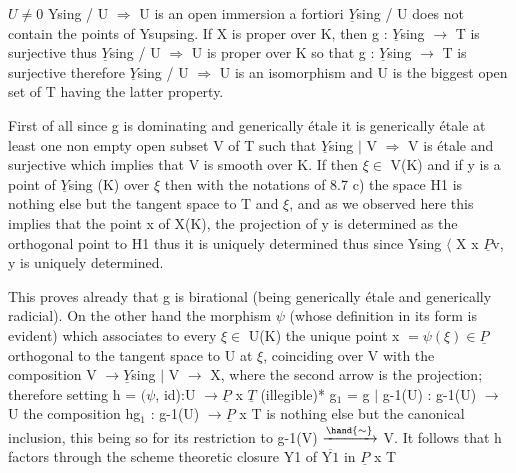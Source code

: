 
$U \neq 0$ Ysing / U $\Rightarrow$ U is an open immersion a fortiori $\underline{Y}$sing / U does 
not contain the points of Ysupsing.  If X is proper over K, then
g : $\underline{Y}$sing $\to$ T is surjective thus $\underline{Y}$sing / U $\Rightarrow$ U is proper over K so
that g : $\underline{Y}$sing $\to$ T is surjective therefore $\underline{Y}$sing / U $\Rightarrow$ U is an
isomorphism and U is the biggest open set of T having the latter 
property.

First of all since g is dominating and generically étale it
is generically étale at least one non empty open subset V of T
such that $\underline{Y}$sing $|$ V $\Rightarrow$ V is étale and surjective which implies that
V is smooth over K.  If then $\xi \in$ V(K) and if y is a point of $\underline{Y}$sing
(K) over $\xi$ then with the notations of 8.7 c) the space H1 is
nothing else but the tangent space to T and $\xi$, and as we observed
here this implies that the point x of X(K), the projection of y is
determined as the orthogonal point to H1 thus it is uniquely
determined thus since Ysing $\langle$ X x $\underline{P}$v, y is uniquely determined.

This proves already that g is birational (being generically
étale and generically radicial).  On the other hand the morphism $\psi$
(whose definition in its form is evident) which associates to
every $\xi \in$ U(K) the unique point x  $= \psi(\xi) \in \underline{P}$ orthogonal to the
tangent space to U at $\xi$, coinciding over V with the composition V
$\to \underline{Y}$sing $|$ V $\to$ X, where the second arrow is the projection;
therefore setting h = $(\psi$, id):U $\to \underline{P}$ x $\underline{T}$ (illegible)*
g$_1$ = g $|$ g-1(U) : g-1(U) $\to$ U the composition hg$_1$ : g-1(U) $\to \underline{P}$ x T
is nothing else but the canonical inclusion, this being so for its
restriction to g-1(V) $\xrightarrow{\hand{\sim}}$ V.  It follows that h
factors through the scheme theoretic closure Y1 of $\overline{\text{Y1}}$ in $\underline{P}$ x T

